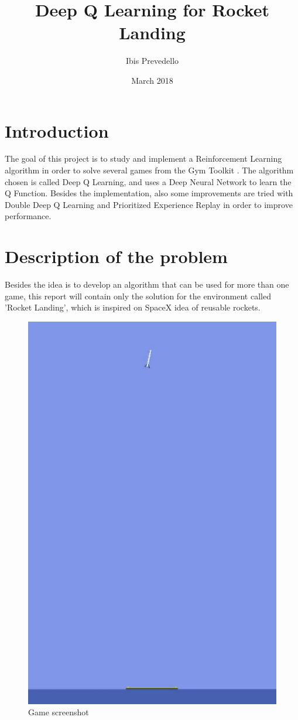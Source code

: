\documentclass{article}
\title{Deep Q Learning for Rocket Landing}
\date{March 2018}
\author{Ibis Prevedello}
\begin{document}
\maketitle

\section{Introduction}
The goal of this project is to study and implement a Reinforcement Learning algorithm in order to solve several games from the Gym Toolkit \cite{gym}. The algorithm chosen is called Deep Q Learning, and uses a Deep Neural Network to learn the Q Function. Besides the implementation, also some improvements are tried with Double Deep Q Learning and Prioritized Experience Replay in order to improve performance.

\section{Description of the problem}
Besides the idea is to develop an algorithm that can be used for more than one game, this report will contain only the solution for the environment called 'Rocket Landing', which is inspired on SpaceX idea of reusable rockets.

\begin{figure}[!ht]
\centering
\includegraphics[scale=0.30]{environment}
\caption{Game screenshot}
\label{fig:fig1}
\end{figure}
\end{document}
